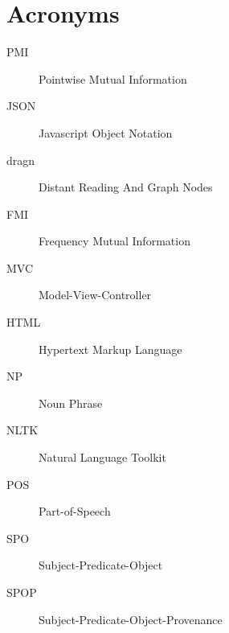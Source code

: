 
\chapter{Acronyms}
\begin{description}
\item[PMI] Pointwise Mutual Information
\item[JSON] Javascript Object Notation
\item[dragn] Distant Reading And Graph Nodes
\item[FMI] Frequency Mutual Information
\item[MVC] Model-View-Controller
\item[HTML] Hypertext Markup Language
\item[NP] Noun Phrase
\item[NLTK] Natural Language Toolkit
\item[POS] Part-of-Speech
\item[SPO] Subject-Predicate-Object
\item[SPOP] Subject-Predicate-Object-Provenance
\end{description}